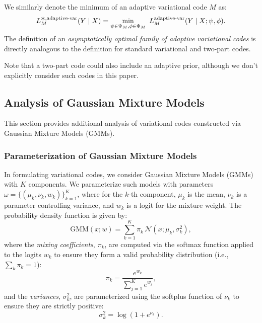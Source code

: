 We similarly denote the minimum of an adaptive variational code $M$ as:
\begin{equation}
L_M^{\bigast,\text{adaptive-var}}(Y \mid X) = \min_{\psi \in \Psi_M,\phi \in \Phi_M}~ L_M^{\text{adaptive-var}}(Y \mid X;\psi,\phi).
\end{equation}
The definition of an \emph{asymptotically optimal family of adaptive variational codes} is directly analogous to the definition for standard variational and two-part codes.

Note that a two-part code could also include an adaptive prior, although we don't explicitly consider such codes in this paper.

\subsection{Analysis of Gaussian Mixture Models}

This section provides additional analysis of variational codes constructed via Gaussian Mixture Models (GMMs).

\subsubsection{Parameterization of Gaussian Mixture Models}
\label{sec:gaussian-parameterization}

In formulating variational codes, we consider Gaussian Mixture Models (GMMs) with $K$ components. We parameterize such models with parameters $\omega = \{(\mu_k, \nu_k, w_k)\}_{k=1}^K$, where for the $k$-th component, $\mu_k$ is the mean, $\nu_k$ is a parameter controlling variance, and $w_k$ is a logit for the mixture weight. The probability density function is given by:
\begin{equation}
    \text{GMM}(x; w) = \sum_{k=1}^{K} \pi_k \, \mathcal{N}(x; \mu_k, \sigma_k^2),
\end{equation}
where the \emph{mixing coefficients}, $\pi_k$, are computed via the softmax function applied to the logits $w_k$ to ensure they form a valid probability distribution (i.e., $\sum_k \pi_k = 1$):
    \begin{equation}
        \pi_k = \frac{e^{w_k}}{\sum_{j=1}^{K} e^{w_j}},
    \end{equation}
and the \emph{variances}, $\sigma_k^2$, are parameterized using the softplus function of $\nu_k$ to ensure they are strictly positive:
    \begin{equation}
        \sigma_k^2 = \log(1 + e^{\nu_k}).
    \end{equation}


